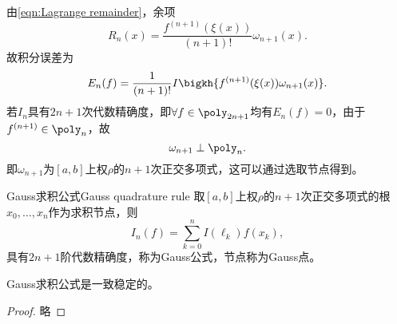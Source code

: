 由\eqref{eqn:Lagrange remainder}，余项
\[
    R_n(x)=\frac{f^{(n+1)}(\xi(x))}{(n+1)!}\omega_{n+1}(x).
\]
故积分误差为
\[
    E_n(f)=\frac1{(n+1)!}I\bigkh{f^{(n+1)}(\xi(x))\omega_{n+1}(x)}.
\]
若$I_n$具有$2n+1$次代数精确度，即$\forall f\in\poly_{2n+1}$均有$E_n(f)=0$，由于$f^{(n+1)}\in\poly_n$，故
\begin{equation}
    \omega_{n+1}\perp\poly_n.
\end{equation}
即$\omega_{n+1}$为$[a,b]$上权$\rho$的$n+1$次正交多项式，这可以通过选取节点得到。

\begin{theorem}
    {Gauss求积公式}{Gauss quadrature rule}
    取$[a,b]$上权$\rho$的$n+1$次正交多项式的根$x_0,\ldots,x_n$作为求积节点，则
    \[
        I_n(f)=\sum_{k=0}^nI(\ell_k)f(x_k),
    \]
    具有$2n+1$阶代数精确度，称为Gauss公式，节点称为Gauss点。
\end{theorem}

\begin{theorem}
    {}{}
    Gauss求积公式是一致稳定的。
\end{theorem}

\begin{proof}
    略
\end{proof}
